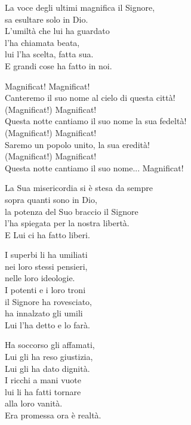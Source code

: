 \documentclass[11pt]{book}
\begin{document}
\settowidth{\versewidth}{Questa notte cantiamo il suo nome la sua fedeltà!}
\begin{canzone}%
La voce degli ultimi magnifica il Signore,\\
sa esultare solo in Dio.\\
L'umiltà che lui ha guardato\\
l'ha chiamata beata,\\
lui l'ha scelta, fatta sua.\\
E grandi cose ha fatto in noi.

\begin{ritornello}
Magnificat! Magnificat!\\
Canteremo il suo nome al cielo di questa città!\\
(Magnificat!) Magnificat!\\
Questa notte cantiamo il suo nome la sua fedeltà!\\
(Magnificat!) Magnificat!\\
Saremo un popolo unito, la sua eredità!\\
(Magnificat!) Magnificat!\\
Questa notte cantiamo il suo nome... Magnificat!
\end{ritornello}

La Sua misericordia si è stesa da sempre\\
sopra quanti sono in Dio,\\
la potenza del Suo braccio il Signore\\
l'ha spiegata per la nostra libertà.\\
E Lui ci ha fatto liberi.

I superbi li ha umiliati\\
nei loro stessi pensieri,\\
nelle loro ideologie.\\
I potenti e i loro troni\\
il Signore ha rovesciato,\\
ha innalzato gli umili\\
Lui l'ha detto e lo farà.

Ha soccorso gli affamati,\\
Lui gli ha reso giustizia,\\
Lui gli ha dato dignità.\\
I ricchi a mani vuote\\
lui li ha fatti tornare\\
alla loro vanità.\\
Era promessa ora è realtà.
\end{canzone}
\benedizionefinale
\end{document}
